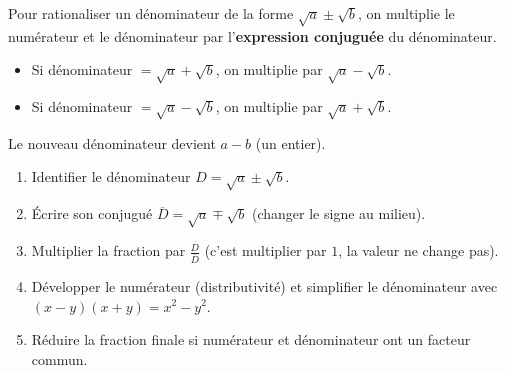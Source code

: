 \documentclass[11pt]{article}
\begin{document}
\begin{propriete}
Pour rationaliser un dénominateur de la forme $\sqrt{a} \pm \sqrt{b}$, on multiplie le numérateur et le dénominateur par l'\textbf{expression conjuguée} du dénominateur.
\begin{itemize}
    \item Si dénominateur $= \sqrt{a} + \sqrt{b}$, on multiplie par $\sqrt{a} - \sqrt{b}$.
    \item Si dénominateur $= \sqrt{a} - \sqrt{b}$, on multiplie par $\sqrt{a} + \sqrt{b}$.
\end{itemize}
Le nouveau dénominateur devient $a - b$ (un entier).
\end{propriete}

\begin{methode}
\begin{enumerate}
    \item Identifier le dénominateur $D = \sqrt{a} \pm \sqrt{b}$.
    \item Écrire son conjugué $\overline{D} = \sqrt{a} \mp \sqrt{b}$ (changer le signe au milieu).
    \item Multiplier la fraction par $\frac{\overline{D}}{\overline{D}}$ (c'est multiplier par $1$, la valeur ne change pas).
    \item Développer le numérateur (distributivité) et simplifier le dénominateur avec $(x-y)(x+y)=x^2-y^2$.
    \item Réduire la fraction finale si numérateur et dénominateur ont un facteur commun.
\end{enumerate}
\end{methode}
\end{document}
